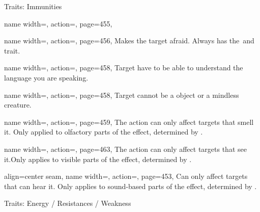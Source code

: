 \begin{PageFront}
\begin{Tables}{\frontTableHeight}
\begin{Table}{Traits: Immunities}
\begin{entry}{}{%
                name width=\conditionLength,%
                action=\Emotion,
                page=455,
            }
            \end{entry}
            \begin{entry}{}{%
                name width=\conditionLength,%
                action=\Fear,
                page=456,
            }
                Makes the target afraid. Always has the \Mental\,and \Emotion\,trait.
            \end{entry}
            \begin{entry}{}{%
                name width=\conditionLength,%
                action=\Linguistic,
                page=458,
            }
                Target have to be able to understand the language you are speaking.
            \end{entry}
            \begin{entry}{}{%
                name width=\conditionLength,%
                action=\Mental,
                page=458,
            }
                Target cannot be a object or a mindless creature.
            \end{entry}
            \begin{entry}{}{%
                name width=\conditionLength,%
                action=\Olfactory,
                page=459,
            }
                The action can only affect targets that smell it. \hfill Only applied to olfactory parts of the
                effect, determined by \GM.
            \end{entry}
            \begin{entry}{}{%
                name width=\conditionLength,%
                action=\Visual,
                page=463,
            }
                The action can only affect targets that see it.\hfill Only applies to visible parts of the effect,
                determined by \GM.
            \end{entry}
            \begin{entry}{}{%
                align=center seam,
                name width=\conditionLength,%
                action=\Auditory,
                page=453,
            }
                Can only affect targets that can hear it. \hfill Only applies to sound-based parts of the effect,
                determined by \GM.\\
            \end{entry}
        \end{Table}
        \TableSpace
        \begin{Table}{Traits: Energy / Resistances / Weakness}

\end{Table}
\end{Tables}
\end{PageFront}
